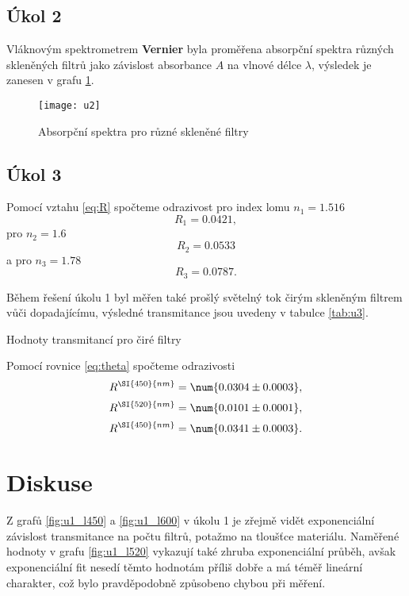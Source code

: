 \documentclass{protokol}
\begin{document}
    \subsection*{Úkol 2}

      Vláknovým spektrometrem \textbf{Vernier} byla proměřena absorpční spektra různých skleněných filtrů jako závislost absorbance $A$ na vlnové délce $\lambda$, výsledek je zanesen v grafu \ref{fig:u2}.

      \begin{figure}[H]
        \centering
        \texttt{[image: u2]}
        \caption{Absorpční spektra pro různé skleněné filtry}
        \label{fig:u2}
      \end{figure}

    \subsection*{Úkol 3}
      
      Pomocí vztahu \eqref{eq:R} spočteme odrazivost pro index lomu $n_1 = \num{1.516}$
      $$ R_1 = \num{0.0421}, $$
      pro $n_2 = \num{1.6}$
      $$ R_2 = \num{0.0533} $$
      a pro $n_3 = \num{1.78}$
      $$ R_3 = \num{0.0787}.$$

      Během řešení úkolu 1 byl měřen také prošlý světelný tok čirým skleněným filtrem vůči dopadajícímu, výsledné transmitance jsou uvedeny v tabulce \ref{tab:u3}.

      \begin{table}[H]
        \centering
        \setlength{\tabcolsep}{10pt}
        
        \caption{Hodnoty transmitancí pro čiré filtry}
        \label{tab:u3}
      \end{table}

      Pomocí rovnice \eqref{eq:theta} spočteme odrazivosti 
      $$ R^{\SI{450}{nm}} = \num{0.0304 \pm 0.0003}, $$
      $$ R^{\SI{520}{nm}} = \num{0.0101 \pm 0.0001}, $$
      $$ R^{\SI{450}{nm}} = \num{0.0341 \pm 0.0003}. $$

  \section*{Diskuse}
    
    Z grafů \ref{fig:u1_l450} a \ref{fig:u1_l600} v úkolu 1 je zřejmě vidět exponenciální závislost transmitance na počtu filtrů, potažmo na tloušťce materiálu. Naměřené hodnoty v grafu \ref{fig:u1_l520} vykazují také zhruba exponenciální průběh, avšak exponenciální fit nesedí těmto hodnotám příliš dobře a má téměř lineární charakter, což bylo pravděpodobně způsobeno chybou při měření.
\end{document}
